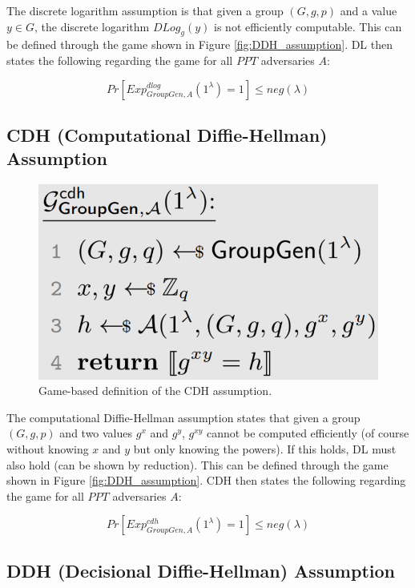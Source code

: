 The discrete logarithm assumption is that given a group $(G,g,p)$ and a value $y \in G$, the discrete logarithm $DLog_g(y)$ is not efficiently computable.
This can be defined through the game shown in Figure \ref{fig:DDH_assumption}.
DL then states the following regarding the game for all $PPT$ adversaries $A$:

$$
    Pr[Exp_{GroupGen,A}^{dlog}(1^\lambda) = 1] \leq neg(\lambda)
$$


\subsection{CDH (Computational Diffie-Hellman) Assumption}

\begin{figure}
    \center
    \includegraphics[width=\linewidth]{gfx/CDH_assumption.png}
    \caption{Game-based definition of the CDH assumption.}
    \label{fig:CDH_assumption}
\end{figure}


The computational Diffie-Hellman assumption states that given a group $(G,g,p)$ and two values $g^x$ and $g^y$, $g^{xy}$ cannot be computed efficiently (of course without knowing $x$ and $y$ but only knowing the powers).
If this holds, DL must also hold (can be shown by reduction).
This can be defined through the game shown in Figure \ref{fig:DDH_assumption}.
CDH then states the following regarding the game for all $PPT$ adversaries $A$:

$$
    Pr[Exp_{GroupGen,A}^{cdh}(1^\lambda) = 1] \leq neg(\lambda)
$$


\subsection{DDH (Decisional Diffie-Hellman) Assumption}

